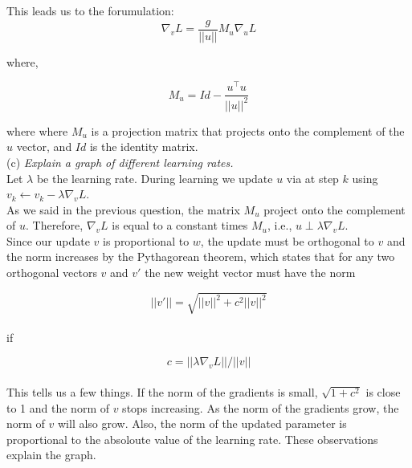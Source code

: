 \documentclass{amsart}
\theoremstyle{definition}
\theoremstyle{remark}
\numberwithin{equation}{section}
\begin{document}
This leads us to the forumulation:\\

\begin{equation}
\nabla_{v}L = \frac{g}{||u||} M_{u} \nabla_{u}L
\end{equation}

where,

\begin{equation}
M_{u} = Id - \frac{u^\top u}{||u||^{2}}
\end{equation}

where where $M_{u}$ is a projection matrix that projects onto the complement
of the $u$ vector, and $Id$ is the identity matrix. \\

(c) \textit{Explain a graph of different learning rates. }\\

Let $\lambda$ be the learning rate. During learning we update $u$ via at step $k$
using $v_k \leftarrow v_k - \lambda\nabla_vL$. \\

As we said in the previous question, the matrix $M_u$ project onto the
complement of $u$. Therefore, $\nabla_vL$ is equal to a constant times
$M_u$, i.e., $u \perp \lambda\nabla_vL$. \\

Since our update $v$ is proportional to $w$, the update must be orthogonal to
$v$ and the norm increases by the Pythagorean theorem, which states that for any
two orthogonal vectors $v$ and $v'$ the new weight vector must have the norm

\begin{equation}
||v'|| = \sqrt{||v||^2 + c^2 ||v||^2}
\end{equation} \\

if

\begin{equation}
c = || \lambda\nabla_vL || / ||v||
\end{equation} \\

This tells us a few things. If the norm of the gradients is small,
$\sqrt{1 + c^2}$ is close to 1 and the norm of $v$ stops increasing. As the
norm of the gradients grow, the norm of $v$ will also grow. Also, the norm of
the updated parameter is proportional to the absoloute value of the learning
rate. These observations explain the graph.
\end{document}
